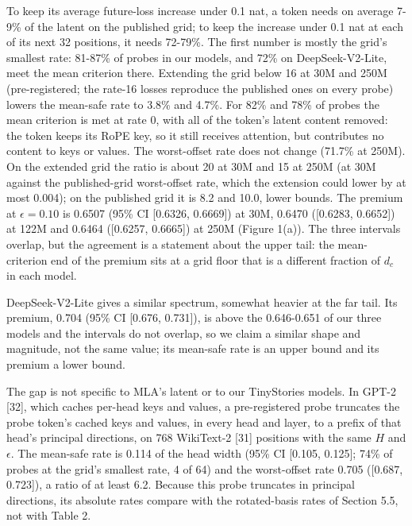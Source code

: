 \documentclass[11pt]{article}
\begin{document}
To keep its average future-loss increase under 0.1 nat, a token needs on average 7-9\% of the latent on the published grid; to keep the increase under 0.1 nat at each of its next 32 positions, it needs 72-79\%. The first number is mostly the grid's smallest rate: 81-87\% of probes in our models, and 72\% on DeepSeek-V2-Lite, meet the mean criterion there. Extending the grid below 16 at 30M and 250M (pre-registered; the rate-16 losses reproduce the published ones on every probe) lowers the mean-safe rate to 3.8\% and 4.7\%. For 82\% and 78\% of probes the mean criterion is met at rate 0, with all of the token's latent content removed: the token keeps its RoPE key, so it still receives attention, but contributes no content to keys or values. The worst-offset rate does not change (71.7\% at 250M). On the extended grid the ratio is about 20 at 30M and 15 at 250M (at 30M against the published-grid worst-offset rate, which the extension could lower by at most 0.004); on the published grid it is 8.2 and 10.0, lower bounds. The premium at $\epsilon=0.10$ is 0.6507 (95\% CI [0.6326, 0.6669]) at 30M, 0.6470 ([0.6283, 0.6652]) at 122M and 0.6464 ([0.6257, 0.6665]) at 250M (Figure 1(a)). The three intervals overlap, but the agreement is a statement about the upper tail: the mean-criterion end of the premium sits at a grid floor that is a different fraction of $d_c$ in each model.

DeepSeek-V2-Lite gives a similar spectrum, somewhat heavier at the far tail. Its premium, 0.704 (95\% CI [0.676, 0.731]), is above the 0.646-0.651 of our three models and the intervals do not overlap, so we claim a similar shape and magnitude, not the same value; its mean-safe rate is an upper bound and its premium a lower bound.

The gap is not specific to MLA's latent or to our TinyStories models. In GPT-2 [32], which caches per-head keys and values, a pre-registered probe truncates the probe token's cached keys and values, in every head and layer, to a prefix of that head's principal directions, on 768 WikiText-2 [31] positions with the same $H$ and $\epsilon$. The mean-safe rate is 0.114 of the head width (95\% CI [0.105, 0.125]; 74\% of probes at the grid's smallest rate, 4 of 64) and the worst-offset rate 0.705 ([0.687, 0.723]), a ratio of at least 6.2. Because this probe truncates in principal directions, its absolute rates compare with the rotated-basis rates of Section 5.5, not with Table 2.
\end{document}
